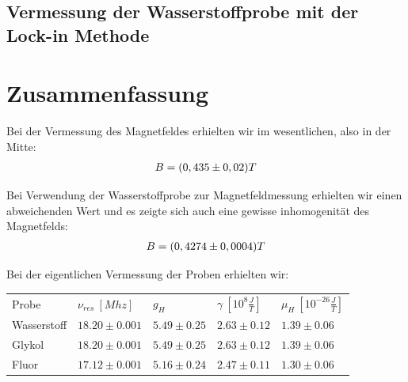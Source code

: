 \documentclass[12pt]{article}
\begin{document}
\subsection{Vermessung der Wasserstoffprobe mit der Lock-in Methode}

\section{Zusammenfassung}

Bei der Vermessung des Magnetfeldes erhielten wir im wesentlichen, also in der Mitte:
\begin{align}
 \notag B=(0,435 \pm 0,02) T
\end{align}

Bei Verwendung der Wasserstoffprobe zur Magnetfeldmessung erhielten wir einen abweichenden Wert und es zeigte sich auch eine gewisse inhomogenität des Magnetfelds:
\begin{align}
 \notag B=(0,4274 \pm 0,0004) T
\end{align}

Bei der eigentlichen Vermessung der Proben erhielten wir:
\begin{center}
\begin{tabular}{l|llll}
Probe & $\nu_{res}~[Mhz]$ & $g_H$ & $\gamma~[10^8\frac{J}{T}]$ & $\mu_H~[10^{-26}\frac{J}{T}]$ \\ 
Wasserstoff & $18.20\pm0.001$ & $5.49\pm0.25$ & $2.63\pm0.12$ & $1.39\pm0.06$ \\ 
Glykol & $18.20\pm0.001$ & $5.49\pm0.25$ & $2.63\pm0.12$ & $1.39\pm0.06$ \\ 
Fluor & $17.12\pm0.001$ & $5.16\pm0.24$ & $2.47\pm0.11$ & $1.30\pm0.06$


\end{tabular}
\end{center}
\end{document}
